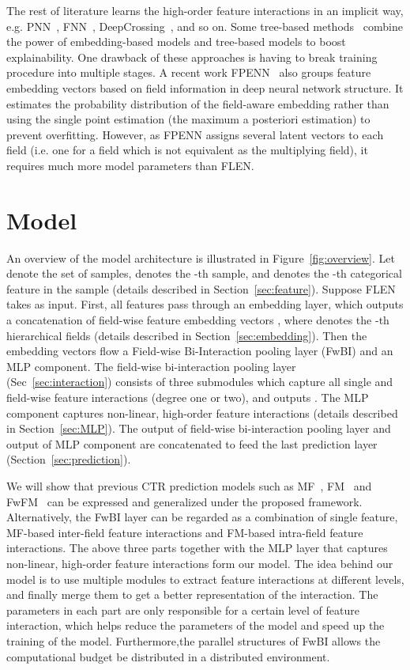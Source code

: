 \documentclass[sigconf]{acmart}
\begin{document}
The rest of literature learns the high-order feature interactions in an implicit way, e.g. PNN~\citep{qu2018product}, FNN~\citep{zhang2016deep}, DeepCrossing~\citep{shan2016deep}, and so on. Some tree-based methods~\citep{zhu2017deep,wang2018tem} combine the power of embedding-based models and tree-based models to boost explainability. One drawback of these approaches is having to break training procedure into multiple stages.
A recent work FPENN~\citep{Liu2018Field} also groups feature embedding vectors based on field information in deep neural network structure. 
It estimates the probability distribution of the field-aware embedding rather than using the single point estimation (the maximum a posteriori estimation) to prevent overfitting. 
However, as FPENN assigns several latent vectors to each field (i.e. one for a field which is not equivalent as the multiplying field), it requires much more model parameters than FLEN. 

\section{Model}\label{sec::model}
An overview of the model architecture is illustrated in Figure~\ref{fig:overview}.
Let  denote the set of samples, 
 denotes the -th sample, and  denotes the -th categorical feature in the sample  (details described in Section~\ref{sec:feature}). 
Suppose FLEN takes  as input.
First, all features pass through an embedding layer, which outputs a concatenation of field-wise feature embedding vectors , where  denotes the -th hierarchical fields (details described in Section~\ref{sec:embedding}).
Then the embedding vectors flow a Field-wise Bi-Interaction pooling layer (FwBI) and an MLP component. The field-wise bi-interaction pooling layer (Sec~\ref{sec:interaction}) consists of three submodules which capture all single and field-wise feature interactions (degree one or two), and outputs .
The MLP component captures non-linear, high-order feature interactions (details described in Section~\ref{sec:MLP}). The output of field-wise bi-interaction pooling layer and output of MLP component are concatenated to feed the last prediction layer (Section~\ref{sec:prediction}). 

We will show that previous CTR prediction models such as MF~\citep{Koren2009Matrix}, FM~\citep{rendle2010factorization} and FwFM~\citep{pan2018field} can be expressed and generalized under the proposed framework. 
Alternatively, the FwBI layer can be regarded as a combination of single feature, MF-based inter-field feature interactions and FM-based intra-field feature interactions. The above three parts together with the MLP layer that captures non-linear, high-order feature interactions form our model. The idea behind our model is to use multiple modules to extract feature interactions at different levels, and finally merge them to get a better representation of the interaction. The parameters in each part are only responsible for a certain level of feature interaction, which helps reduce the parameters of the model and speed up the training of the model. Furthermore,the parallel structures of FwBI allows the computational budget be distributed in a distributed environment.
\end{document}
